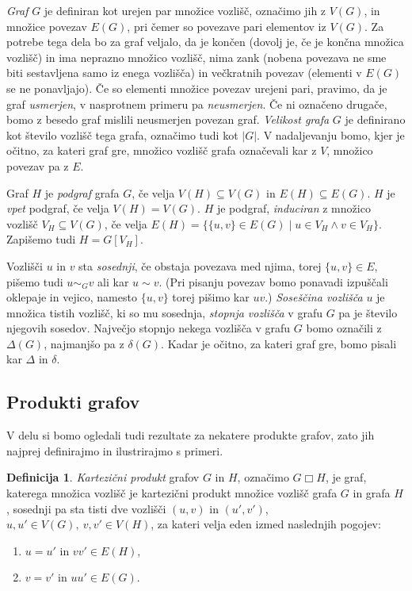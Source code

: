 \documentclass[12pt,a4paper,twoside]{article}
\theoremstyle{definition} %
\newtheorem{definicija}{Definicija}[section]
\theoremstyle{plain} %
\numberwithin{equation}{section}  %
\DeclareMathOperator{\boxempty}{\Box}
\begin{document}
\emph{Graf} $G$ je definiran kot urejen par množice vozlišč, označimo jih z $V(G)$, in množice povezav $E(G)$, pri čemer so povezave pari elementov iz $V(G)$. Za potrebe tega dela bo za graf veljalo, da je končen (dovolj je, če je končna množica vozlišč) in ima neprazno množico vozlišč, nima zank (nobena povezava ne sme biti sestavljena samo iz enega vozlišča) in večkratnih povezav (elementi v $E(G)$ se ne ponavljajo). Če so elementi množice povezav urejeni pari, pravimo, da je graf \emph{usmerjen}, v nasprotnem primeru pa \emph{neusmerjen}. Če ni označeno drugače, bomo z besedo graf mislili neusmerjen povezan graf. \emph{Velikost grafa} $G$ je definirano kot število vozlišč tega grafa, označimo tudi kot $|G|$. V nadaljevanju bomo, kjer je očitno, za kateri graf gre, množico vozlišč grafa označevali kar z $V$, množico povezav pa z $E$. 

Graf $H$ je \emph{podgraf} grafa $G$, če velja $V(H) \subseteq V(G)$ in $E(H) \subseteq E(G)$. $H$ je \emph{vpet} podgraf, če velja $V(H) = V(G)$. $H$ je podgraf, \emph{induciran} z množico vozlišč $V_H \subseteq V(G)$, če velja $E(H) = \{ \{ u,v \} \in E(G) \mid u \in V_H \land v \in V_H \}$. Zapišemo tudi $H = G[V_H]$.

Vozlišči $u$ in $v$ sta \emph{sosednji}, če obstaja povezava med njima, torej $\{u,v\} \in E$, pišemo tudi $u \sim_G v$ ali kar $u \sim v$. (Pri pisanju povezav bomo ponavadi izpuščali oklepaje in vejico, namesto $\{u,v\}$ torej pišimo kar $uv$.) \emph{Soseščina vozlišča} $u$ je množica tistih vozlišč, ki so mu sosednja, \emph{stopnja vozlišča} v grafu $G$ pa je število njegovih sosedov. Največjo stopnjo nekega vozlišča v grafu $G$ bomo označili z $\Delta(G)$, najmanjšo pa z $\delta(G)$. Kadar je očitno, za kateri graf gre, bomo pisali kar $\Delta$ in $\delta$.

\subsection{Produkti grafov}
V delu si bomo ogledali tudi rezultate za nekatere produkte grafov, zato jih najprej definirajmo in ilustrirajmo s primeri.

\begin{definicija}
    \emph{Kartezični produkt} grafov $G$ in $H$, označimo $G \boxempty H$, je graf, katerega  množica vozlišč je kartezični produkt množice vozlišč grafa $G$ in grafa $H$, sosednji pa sta tisti dve vozlišči $(u, v)$ in $(u', v')$, $u, u' \in V(G),\ v, v' \in V(H)$, za kateri velja eden izmed naslednjih pogojev:
    \begin{enumerate}
        \item $u = u'$ in $vv' \in E(H)$,
        \item $v = v'$ in $uu' \in E(G)$.
    \end{enumerate}
\end{definicija}
\end{document}
